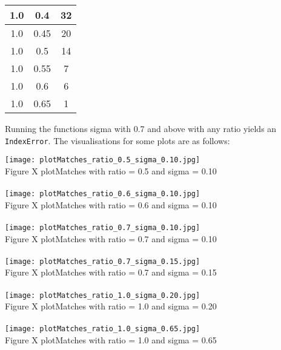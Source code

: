 \documentclass[12pt,letterpaper, onecolumn]{exam}
\begin{document}
\begin{questions}
\begin{solution}
\begin{center}
\begin{tabular}{|c|c|c|}
                \hline
                1.0 & 0.4 & 32 \\
                \hline
                1.0 & 0.45 & 20 \\
                \hline
                1.0 & 0.5 & 14 \\
                \hline
                1.0 & 0.55 & 7 \\
                \hline
                1.0 & 0.6 & 6 \\
                \hline
                1.0 & 0.65 & 1 \\
                \hline
            \end{tabular}
        \end{center}
        Running the functions sigma with 0.7 and above with any ratio yields an \\\texttt{IndexError}. 
        The visualisations for some plots are as follows:
        \begin{center}
            \texttt{[image: plotMatches\_ratio\_0.5\_sigma\_0.10.jpg]} \\
            Figure X plotMatches with ratio = 0.5 and sigma = 0.10 \\~\\
            \texttt{[image: plotMatches\_ratio\_0.6\_sigma\_0.10.jpg]} \\
            Figure X plotMatches with ratio = 0.6 and sigma = 0.10 \\~\\
            \texttt{[image: plotMatches\_ratio\_0.7\_sigma\_0.10.jpg]} \\
            Figure X plotMatches with ratio = 0.7 and sigma = 0.10 \\~\\
            \texttt{[image: plotMatches\_ratio\_0.7\_sigma\_0.15.jpg]} \\
            Figure X plotMatches with ratio = 0.7 and sigma = 0.15 \\~\\
            \texttt{[image: plotMatches\_ratio\_1.0\_sigma\_0.20.jpg]} \\
            Figure X plotMatches with ratio = 1.0 and sigma = 0.20 \\~\\
            \texttt{[image: plotMatches\_ratio\_1.0\_sigma\_0.65.jpg]} \\
            Figure X plotMatches with ratio = 1.0 and sigma = 0.65

\end{center}
\end{solution}
\end{questions}
\end{document}
